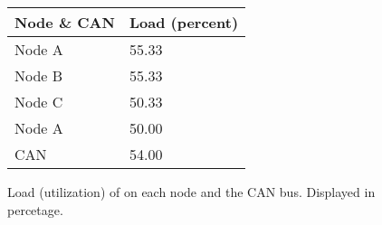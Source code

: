     \renewcommand{\arraystretch}{1.4}
    \begin{figure}[H]
    \centering
    \begin{minipage}{0.5\textwidth}
        \begin{table}[H]
        \centering
        \begin{tabular}{|l|l|}
            \hline
            \rowcolor{green!40}\textbf{Node \& CAN}  & \textbf{Load (percent)}   \\ \hline
            Node A                                  & 55.33                     \\ \hline
            Node B                                  & 55.33                     \\ \hline
            Node C                                  & 50.33                     \\ \hline
            Node A                                  & 50.00                     \\ \hline
            CAN                                     & 54.00                     \\ \hline
        \end{tabular}
        \end{table}
    \end{minipage}%
    \caption{Load (utilization) of on each node and the CAN bus. Displayed in percetage.}
    \label{fig:Load}
    \end{figure}
    \renewcommand{\arraystretch}{1.0}

